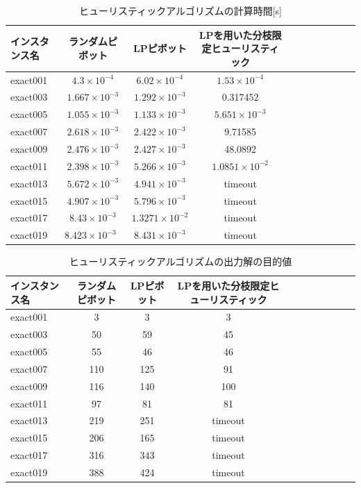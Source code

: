 \documentclass[10.5,a4paper,titlepage, dvipdfmx]{bxjsarticle}
\begin{document}
\begin{table}[H]
    \caption{ヒューリスティックアルゴリズムの計算時間[s]}
    \label{table:data_type}
    \centering
    \begin{tabular}{l|cccccccccr}
        \hline
        インスタンス名 & ランダムピボット  &  LPピボット & LPを用いた分枝限定ヒューリスティック\\
        \hline
        exact001  & $4.3 \times 10^{-4}$   & $6.02 \times 10^{-4}$  & $1.53 \times 10^{-4}$ &\\
        exact003 & $1.667 \times 10^{-3}$  & $1.292 \times 10^{-3}$  & 0.317452\\
        exact005 & $1.055 \times 10^{-3}$ & $1.133 \times 10^{-3}$ & $5.651 \times 10^{-3}$ \\
        exact007 & $2.618 \times 10^{-3}$ & $2.422 \times 10^{-3}$ & 9.71585\\
        exact009 & $2.476 \times 10^{-3}$ & $2.427 \times 10^{-3}$ & 48.0892\\
        exact011 & $2.398 \times 10^{-3}$ & $5.266 \times 10^{-3}$ & $1.0851 \times 10^{-2}$\\
        exact013 & $5.672 \times 10^{-3}$  & $4.941 \times 10^{-3}$ & timeout\\
        exact015 & $4.907 \times 10^{-3}$ & $5.796 \times 10^{-3}$ & timeout\\
        exact017 & $8.43 \times 10^{-3}$ & $1.3271 \times 10^{-2}$ & timeout\\
        exact019 & $8.423 \times 10^{-3}$\ & $8.431 \times 10^{-3}$ & timeout\\
        \hline
    \end{tabular}
\end{table}

\begin{table}[H]
    \caption{ヒューリスティックアルゴリズムの出力解の目的値}
    \label{table:data_type}
    \centering
    \begin{tabular}{l|cccccccccr}
        \hline
        インスタンス名  & ランダムピボット  &  LPピボット & LPを用いた分枝限定ヒューリスティック\\
        \hline
        exact001  & 3  & 3  & 3\\
        exact003 & 50 & 59 & 45\\
        exact005 & 55 & 46 & 46\\
        exact007 & 110 & 125 & 91\\
        exact009 & 116 & 140 & 100\\
        exact011 & 97 & 81 & 81\\
        exact013 & 219 & 251 & timeout\\
        exact015 & 206 & 165 & timeout\\
        exact017 & 316 & 343 & timeout\\
        exact019 & 388 & 424 & timeout\\
        \hline
    \end{tabular}
\end{table}
\end{document}
